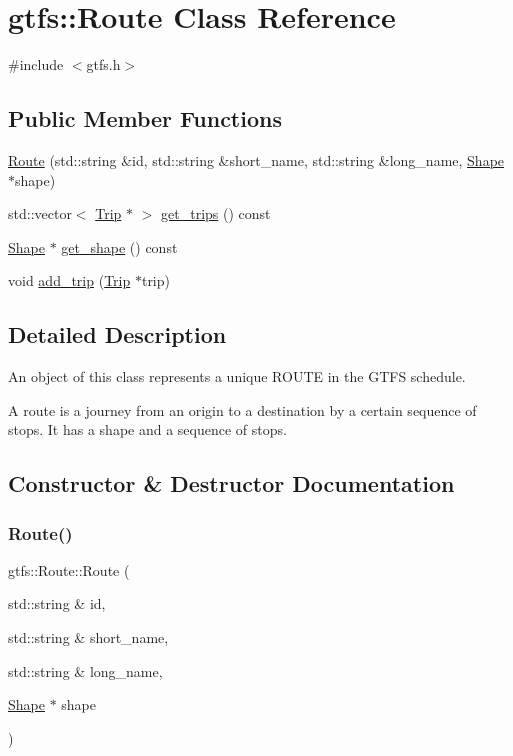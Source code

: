 \hypertarget{classgtfs_1_1Route}{}\section{gtfs\+:\+:Route Class Reference}
\label{classgtfs_1_1Route}


{\ttfamily \#include $<$gtfs.\+h$>$}

\subsection*{Public Member Functions}
\begin{DoxyCompactItemize}
\item 
\hyperlink{classgtfs_1_1Route_a0fedb911da23329a08298a6b7fee0629}{Route} (std\+::string \&id, std\+::string \&short\+\_\+name, std\+::string \&long\+\_\+name, \hyperlink{classgtfs_1_1Shape}{Shape} $\ast$shape)
\item 
std\+::vector$<$ \hyperlink{classgtfs_1_1Trip}{Trip} $\ast$ $>$ \hyperlink{classgtfs_1_1Route_abaca9da2c173387571e1628402eece98}{get\+\_\+trips} () const
\item 
\hyperlink{classgtfs_1_1Shape}{Shape} $\ast$ \hyperlink{classgtfs_1_1Route_a02a7b087a0989501dcfbdf4af033f1f5}{get\+\_\+shape} () const
\item 
void \hyperlink{classgtfs_1_1Route_a6029f8e970cc520ca03f58cb8e348b79}{add\+\_\+trip} (\hyperlink{classgtfs_1_1Trip}{Trip} $\ast$trip)
\end{DoxyCompactItemize}


\subsection{Detailed Description}
An object of this class represents a unique R\+O\+U\+TE in the G\+T\+FS schedule.

A route is a journey from an origin to a destination by a certain sequence of stops. It has a shape and a sequence of stops. 

\subsection{Constructor \& Destructor Documentation}
\mbox{\label{classgtfs_1_1Route_a0fedb911da23329a08298a6b7fee0629}} 
\subsubsection{\texorpdfstring{Route()}{Route()}}
{\footnotesize\ttfamily gtfs\+::\+Route\+::\+Route (\begin{DoxyParamCaption}\item[{std\+::string \&}]{id,  }\item[{std\+::string \&}]{short\+\_\+name,  }\item[{std\+::string \&}]{long\+\_\+name,  }\item[{\hyperlink{classgtfs_1_1Shape}{Shape} $\ast$}]{shape }\end{DoxyParamCaption})}

